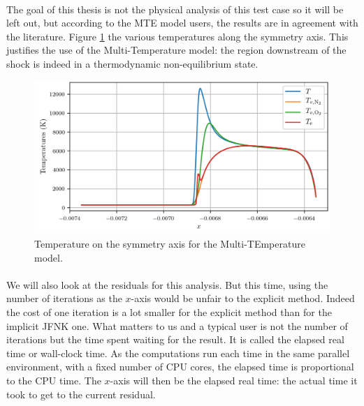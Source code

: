         \paragraph{}
        The goal of this thesis is not the physical analysis of this test case so it will be left out, but according to the MTE model users, the results are in agreement with the literature.
        Figure \ref{fig:sphere_mte_temperatures} the various temperatures along the symmetry axis.
        This justifies the use of the Multi-Temperature model: the region downstream of the shock is indeed in a thermodynamic non-equilibrium state.

        \begin{figure}
          \centering
          \includegraphics{figures/sphere_mte_temperatures.png}
          \caption{Temperature on the symmetry axis for the Multi-TEmperature model.}
          \label{fig:sphere_mte_temperatures}
        \end{figure}

        \paragraph{}
        We will also look at the residuals for this analysis.
        But this time, using the number of iterations as the $x$-axis would be unfair to the explicit method.
        Indeed the cost of one iteration is a lot smaller for the explicit method than for the implicit JFNK one.
        What matters to us and a typical user is not the number of iterations but the time spent waiting for the result.
        It is called the elapsed real time or wall-clock time.
        As the computations run each time in the same parallel environment, with a fixed number of CPU cores, the elapsed time is proportional to the CPU time.
        The $x$-axis will then be the elapsed real time: the actual time it took to get to the current residual.

